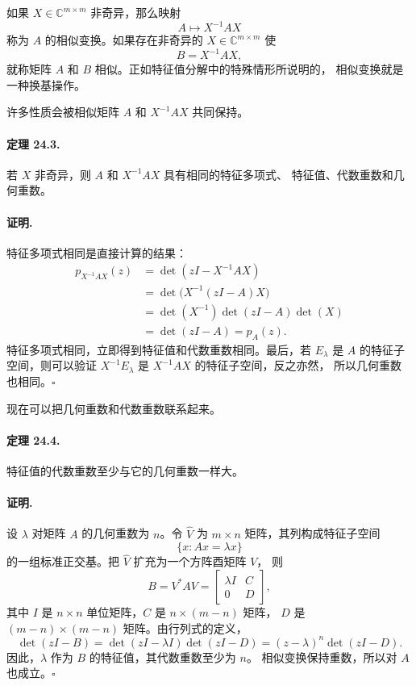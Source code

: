 \documentclass[UTF8,fontset=none,12pt]{ctexart}
\begin{document}
如果 $X\in\mathbb{C}^{m\times m}$ 非奇异，那么映射
\[
A\longmapsto X^{-1}AX
\]
称为 $A$ 的相似变换。如果存在非奇异的
$X\in\mathbb{C}^{m\times m}$ 使
\[
B=X^{-1}AX,
\]
就称矩阵 $A$ 和 $B$ 相似。正如特征值分解中的特殊情形所说明的，
相似变换就是一种换基操作。

许多性质会被相似矩阵 $A$ 和 $X^{-1}AX$ 共同保持。

\paragraph{定理 24.3.}
若 $X$ 非奇异，则 $A$ 和 $X^{-1}AX$ 具有相同的特征多项式、
特征值、代数重数和几何重数。

\paragraph{证明.}
特征多项式相同是直接计算的结果：
\[
\begin{aligned}
p_{X^{-1}AX}(z)
&=\det(zI-X^{-1}AX)\\
&=\det\bigl(X^{-1}(zI-A)X\bigr)\\
&=\det(X^{-1})\det(zI-A)\det(X)\\
&=\det(zI-A)=p_A(z).
\end{aligned}
\]
特征多项式相同，立即得到特征值和代数重数相同。最后，若
$E_\lambda$ 是 $A$ 的特征子空间，则可以验证
$X^{-1}E_\lambda$ 是 $X^{-1}AX$ 的特征子空间，反之亦然，
所以几何重数也相同。\hfill$\square$

现在可以把几何重数和代数重数联系起来。

\paragraph{定理 24.4.}
特征值的代数重数至少与它的几何重数一样大。

\paragraph{证明.}
设 $\lambda$ 对矩阵 $A$ 的几何重数为 $n$。令 $\widehat V$ 为
$m\times n$ 矩阵，其列构成特征子空间
\[
\{x:Ax=\lambda x\}
\]
的一组标准正交基。把 $\widehat V$ 扩充为一个方阵酉矩阵 $V$，
则
\[
B=V^*AV=
\begin{bmatrix}
\lambda I&C\\
0&D
\end{bmatrix},
\tag{24.7}
\]
其中 $I$ 是 $n\times n$ 单位矩阵，$C$ 是 $n\times(m-n)$ 矩阵，
$D$ 是 $(m-n)\times(m-n)$ 矩阵。由行列式的定义，
\[
\det(zI-B)=\det(zI-\lambda I)\det(zI-D)
=(z-\lambda)^n\det(zI-D).
\]
因此，$\lambda$ 作为 $B$ 的特征值，其代数重数至少为 $n$。
相似变换保持重数，所以对 $A$ 也成立。\hfill$\square$
\end{document}
